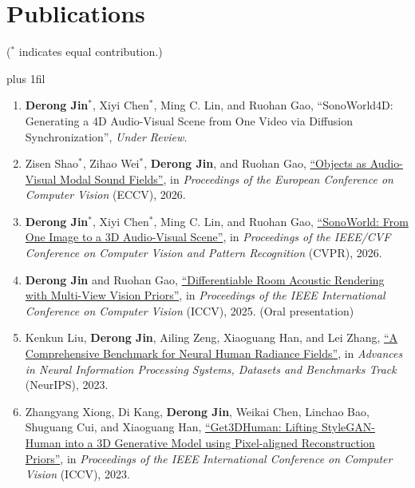 \documentclass[11pt]{article}
\newcommand{\papertitle}[2]{{\hypersetup{hidelinks}\href{#1}{``#2''}}}
\begin{document}
\section{Publications}
{\small ($^*$ indicates equal contribution.)\par}
\begingroup
\spaceskip=0pt
\rightskip=0pt
\parfillskip=0pt plus 1fil
\begin{enumerate}[itemsep=5pt]
\item \textbf{Derong Jin}$^*$, Xiyi Chen$^*$, Ming C. Lin, and Ruohan Gao,
``SonoWorld4D: Generating a 4D Audio-Visual Scene from One Video via Diffusion Synchronization'', \textit{Under Review.}

\item Zisen Shao$^*$, Zihao Wei$^*$, \textbf{Derong Jin}, and Ruohan Gao,
\papertitle{https://arxiv.org/abs/2608.05145}{Objects as Audio-Visual Modal Sound Fields}, in \textit{Proceedings of the European Conference on Computer Vision} (ECCV), 2026.

\item \textbf{Derong Jin}$^*$, Xiyi Chen$^*$, Ming C. Lin, and Ruohan Gao,
\papertitle{https://arxiv.org/abs/2603.28757}{SonoWorld: From One Image to a 3D Audio-Visual Scene}, in \textit{Proceedings of the IEEE/CVF Conference on Computer Vision and Pattern Recognition} (CVPR), 2026.

\item \textbf{Derong Jin} and Ruohan Gao,
\papertitle{https://arxiv.org/abs/2504.21847}{Differentiable Room Acoustic Rendering with Multi-View Vision Priors}, in \textit{Proceedings of the IEEE International Conference on Computer Vision} (ICCV), 2025. ({\color{red}Oral presentation})

\item Kenkun Liu, \textbf{Derong Jin}, Ailing Zeng, Xiaoguang Han, and Lei Zhang,
\papertitle{https://openreview.net/forum?id=7kc4gtEk3b}{A Comprehensive Benchmark for Neural Human Radiance Fields}, in \textit{Advances in Neural Information Processing Systems, Datasets and Benchmarks Track} (NeurIPS), 2023.

\item Zhangyang Xiong, Di Kang, \textbf{Derong Jin}, Weikai Chen, Linchao Bao, Shuguang Cui, and Xiaoguang Han,
\papertitle{https://arxiv.org/abs/2302.01162}{Get3DHuman: Lifting StyleGAN-Human into a 3D Generative Model using Pixel-aligned Reconstruction Priors}, in \textit{Proceedings of the IEEE International Conference on Computer Vision} (ICCV), 2023.
\end{enumerate}
\endgroup
\end{document}
